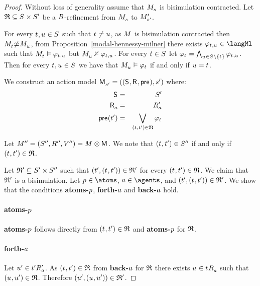 \begin{proof}
Without loss of generality assume that $\kPModel{\kStateS}$ is bisimulation contracted.
Let $\refinement \subseteq \kStates \times \kStatesP$ be a $B$-refinement from $\kPModel{\kStateS}$ to ${M^{\prime}_{{s}^{\prime}}}$.

For every $\kStateT, \kStateU \in \kStates$ such that $\kStateT \neq \kStateU$, as $\kModel$ is bisimulation contracted then $\kPModel{\kStateT} \nbisimilar \kPModel{\kStateU}$, from Proposition~\ref{modal-hennessy-milner} there exists $\phi_{\kStateT, \kStateU} \in \langMl$ such that $\kPModel{\kStateT} \entails \phi_{\kStateT, \kStateU}$ but $\kPModel{\kStateU} \nentails \phi_{\kStateT, \kStateU}$.
For every $\kStateT \in \kStates$ let $\phi_{\kStateT} = \bigwedge_{\kStateU \in \kStates \setminus \{\kStateT\}} \phi_{\kStateT, \kStateU}$.
Then for every $\kStateT, \kStateU \in \kStates$ we have that $\kPModel{\kStateU} \entails \phi_{\kStateT}$ if and only if $\kStateU = \kStateT$.

We construct an action model $\aPModelAndTuple{\kStateSP}$ where:
\begin{eqnarray*}
    \aStates &=& \kStatesP\\
    \aAccessibilityA &=& \kAccessibilityPA\\
    \aPrecondition(\kStateTP) &=& \bigvee_{(\kStateT, \kStateTP) \in \refinement} \phi_{\kStateT}
\end{eqnarray*}

Let $\kModelAndTuplePP = \kModel \exec \aModel$. 
We note that $(\kStateT, \kStateTP) \in \kStatesPP$ if and only if $(\kStateT, \kStateTP) \in \refinement$.

Let $\mathfrak{R}' \subseteq {S^{\prime}} \times {S^{\prime\prime}}$ such that $(\kStateTP, (\kStateT, \kStateTP)) \in \bisimulation' $ for every $(\kStateT, \kStateTP) \in \refinement$.
We claim that $\mathfrak{R}'$ is a bisimulation.
Let $\atomP \in \atoms$, $\agentA \in \agents$, and $(\kStateTP, (\kStateT, \kStateTP)) \in \bisimulation'$.
We show that the conditions {\bf atoms-$p$}, {\bf forth-$a$} and {\bf back-$a$} hold.

\paragraph{atoms-$p$}
{\bf atoms-$p$} follows directly from $(\kStateT, \kStateTP) \in \refinement$ and {\bf atoms-$p$} for $\mathfrak{R}$.

\paragraph{forth-$a$}
Let ${u}^{\prime} \in {{t}^{\prime}} {R^{\prime}_{a}}$.
As $(\kStateT, \kStateTP) \in \refinement$ from {\bf back-$a$} for $\mathfrak{R}$ there exists $\kStateU \in \kSuccessorsA{\kStateT}$ such that $(\kStateU, \kStateUP) \in \refinement$.
Therefore $(\kStateUP, (\kStateU, \kStateUP)) \in \bisimulation'$.


\end{proof}
